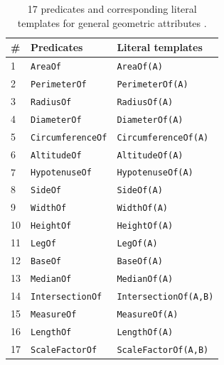 \begin{table}[ht]
\footnotesize
\centering 
\begin{tabular}{lll}
	\toprule
	\# & \textbf{Predicates} & \textbf{Literal templates} \\
	\midrule
	1 & \texttt{AreaOf} & \texttt{AreaOf(A)} \\
	2 & \texttt{PerimeterOf} & \texttt{PerimeterOf(A)} \\
	3 & \texttt{RadiusOf} & \texttt{RadiusOf(A)} \\
	4 & \texttt{DiameterOf} & \texttt{DiameterOf(A)} \\
	5 & \texttt{CircumferenceOf}& \texttt{CircumferenceOf(A)}\\
	6 & \texttt{AltitudeOf} & \texttt{AltitudeOf(A)}\\
	7 & \texttt{HypotenuseOf} & \texttt{HypotenuseOf(A)}\\
	8 & \texttt{SideOf} & \texttt{SideOf(A)}\\
	9 & \texttt{WidthOf} & \texttt{WidthOf(A)}\\
	10 & \texttt{HeightOf} & \texttt{HeightOf(A)} \\
	11 & \texttt{LegOf} & \texttt{LegOf(A)} \\
	12 & \texttt{BaseOf} & \texttt{BaseOf(A)}\\
	13 & \texttt{MedianOf} & \texttt{MedianOf(A)}\\
	14 & \texttt{IntersectionOf} & \texttt{IntersectionOf(A,B)}\\
	15 & \texttt{MeasureOf} & \texttt{MeasureOf(A)}\\
	16 & \texttt{LengthOf} & \texttt{LengthOf(A)}\\
	17 & \texttt{ScaleFactorOf} & \texttt{ScaleFactorOf(A,B)}\\
	\bottomrule
\end{tabular}
\caption{17 predicates and corresponding literal templates for general geometric attributes .}
\label{appex:predicate3}
\end{table}

